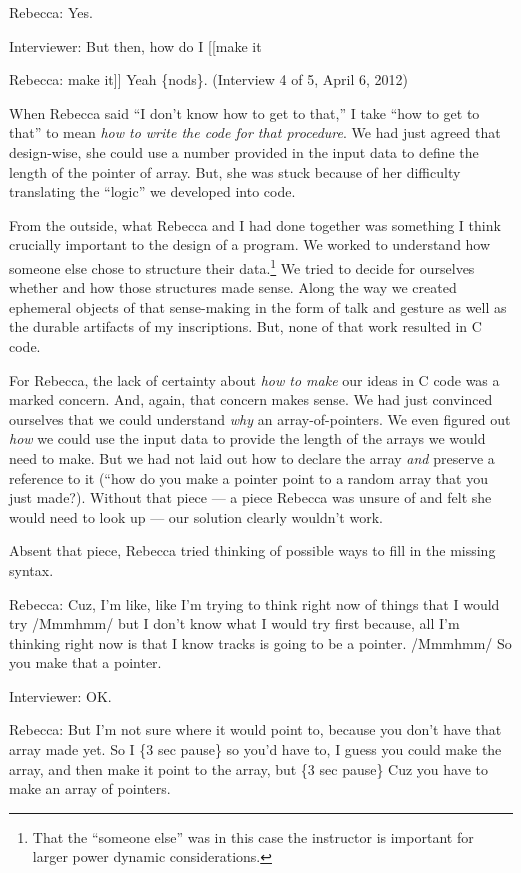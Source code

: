 Rebecca: Yes.

Interviewer: But then, how do I {[}{[}make it

Rebecca: make it{]}{]} Yeah \{nods\}. (Interview 4 of 5, April 6, 2012)

When Rebecca said ``I don't know how to get to that,'' I take ``how to
get to that'' to mean \emph{how to write the code for that procedure}.
We had just agreed that design-wise, she could use a number provided in
the input data to define the length of the pointer of array. But, she
was stuck because of her difficulty translating the ``logic'' we
developed into code.

From the outside, what Rebecca and I had done together was something I
think crucially important to the design of a program. We worked to
understand how someone else chose to structure their data.\footnote{That
  the ``someone else'' was in this case the instructor is important for
  larger power dynamic considerations.} We tried to decide for ourselves
whether and how those structures made sense. Along the way we created
ephemeral objects of that sense-making in the form of talk and gesture
as well as the durable artifacts of my inscriptions. But, none of that
work resulted in C code.

For Rebecca, the lack of certainty about \emph{how to make} our ideas in
C code was a marked concern. And, again, that concern makes sense. We
had just convinced ourselves that we could understand \emph{why} an
array-of-pointers. We even figured out \emph{how} we could use the input
data to provide the length of the arrays we would need to make. But we
had not laid out how to declare the array \emph{and} preserve a
reference to it (``how do you make a pointer point to a random array
that you just made?). Without that piece --- a piece Rebecca was unsure
of and felt she would need to look up --- our solution clearly wouldn't
work.

Absent that piece, Rebecca tried thinking of possible ways to fill in
the missing syntax.

Rebecca: Cuz, I'm like, like I'm trying to think right now of things
that I would try /Mmmhmm/ but I don't know what I would try first
because, all I'm thinking right now is that I know tracks is going to be
a pointer. /Mmmhmm/ So you make that a pointer.

Interviewer: OK.

Rebecca: But I'm not sure where it would point to, because you don't
have that array made yet. So I \{3 sec pause\} so you'd have to, I guess
you could make the array, and then make it point to the array, but \{3
sec pause\} Cuz you have to make an array of pointers.

